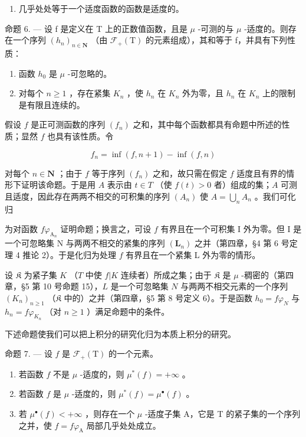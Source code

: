 \begin{enumerate}
\def\labelenumi{\arabic{enumi})}
\setcounter{enumi}{3}
\tightlist
\item
  几乎处处等于一个适度函数的函数是适度的。
\end{enumerate}

命题 6. --- 设 f 是定义在 T 上的正数值函数，且是 \(\mu\) -可测的与 \(\mu\) -适度的。则存在一个序列 \((h_{n})_{n\in\mathbf{N}}\) （由 \(\mathcal{F}_{+}(\mathrm{T})\) 的元素组成），其和等于 f，并具有下列性质：

\begin{enumerate}
\def\labelenumi{\arabic{enumi})}
\item
  函数 \(h_0\) 是 \(\mu\) -可忽略的。
\item
  对每个 \(n \geqslant 1\) ，存在紧集 \(K_{n}\) ，使 \(h_{n}\) 在 \(K_{n}\) 外为零，且 \(h_{n}\) 在 \(K_{n}\) 上的限制是有限且连续的。
\end{enumerate}

假设 \(f\) 是正可测函数的序列 \((f_n)\) 之和，其中每个函数都具有命题中所述的性质；显然 \(f\) 也具有该性质。令

\[
f _ {n} = \inf (f, n + 1) - \inf (f, n)
\]

对每个 \(n \in \mathbf{N}\) ；由于 \(f\) 等于序列 \((f_n)\) 之和，故只需在假定 \(f\) 适度且有界的情形下证明该命题。于是用 \(A\) 表示由 \(t \in T\) （使 \(f(t) > 0\) 者）组成的集；\(A\) 可测且适度，因此存在两两不相交的可积集的序列 \((A_n)\) 使 \(A = \bigcup_{n} A_n\) 。我们可化归

为对函数 \(f\varphi_{\mathrm{A}_n}\) 证明命题；换言之，可设 \(f\) 有界且在一个可积集 I 外为零。但 I 是一个可忽略集 N 与两两不相交的紧集的序列 \((\mathbf{L}_n)\) 之并（第四章，§4 第 6 号定理 4 推论 2）。于是化归为处理 \(f\) 有界且在一个紧集 L 外为零的情形。

设 \(\mathfrak{K}\) 为紧子集 \(K\) （\(T\) 中使 \(f|K\) 连续者）所成之集；由于 \(\mathfrak{K}\) 是 \(\mu\) -稠密的（第四章，§5 第 10 号命题 15），\(L\) 是一个可忽略集 \(N\) 与两两不相交元素的一个序列 \((K_n)_{n \geqslant 1}\) （\(\mathfrak{K}\) 中的）之并（第四章，§5 第 8 号定义 6）。于是函数 \(h_0 = f\varphi_N\) 与 \(h_n = f\varphi_{K_n}\) （对 \(n \geqslant 1\) ）满足命题中的条件。

下述命题使我们可以把上积分的研究化归为本质上积分的研究。

命题 7. --- 设 \(f\) 是 \(\mathcal{F}_{+}(\mathrm{T})\) 的一个元素。

\begin{enumerate}
\def\labelenumi{\arabic{enumi})}
\item
  若函数 \(f\) 不是 \(\mu\) -适度的，则 \(\mu^{*}(f) = +\infty\) 。
\item
  若函数 \(f\) 是 \(\mu\) -适度的，则 \(\mu^{*}(f) = \mu^{\bullet}(f)\) 。
\item
  若 \(\mu^{\bullet}(f) < +\infty\) ，则存在一个 \(\mu\) -适度子集 A，它是 T 的紧子集的一个序列之并，使 \(f = f\varphi_{\mathrm{A}}\) 局部几乎处处成立。
\end{enumerate}

